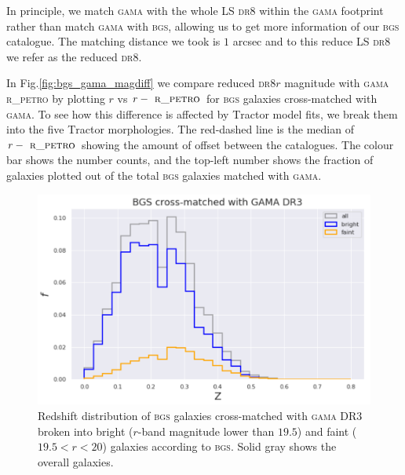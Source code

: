 \documentclass[fleqn,usenatbib]{mnras}
\newcommand{\BGS}{\textsc{bgs}\xspace}
\newcommand{\DReight}{\textsc{dr8}\xspace}
\newcommand{\GAMA}{\textsc{gama}\xspace}
\newcommand{\RPETRO}{{\textsc{ r\_petro}}\xspace}
\newcommand{\TRACTOR}{\textsc{T}ractor\xspace}
\begin{document}
In principle, we match \GAMA with the whole LS \DReight within the \GAMA footprint rather than match \GAMA with \BGS, allowing us to get more information of our \BGS catalogue. The matching distance we took is $1$ arcsec and to this reduce LS \DReight we refer as the reduced \DReight.

In Fig.\ref{fig:bgs_gama_magdiff} we compare reduced \DReight $r$ magnitude with \GAMA \RPETRO by plotting $r$ vs $r-\RPETRO$ for \BGS galaxies cross-matched with \GAMA. To see how this difference is affected by \TRACTOR model fits, we break them into the five \TRACTOR morphologies. The red-dashed line is the median of $r-\RPETRO$ showing the amount of offset between the catalogues. The colour bar shows the number counts, and the top-left number shows the fraction of galaxies plotted out of the total \BGS galaxies matched with \GAMA. 

\begin{figure}
	\includegraphics[width=\columnwidth]{images/bgs_gama_z}
    \caption{Redshift distribution of \BGS galaxies cross-matched with \GAMA DR3 broken into bright ($r$-band magnitude lower than $19.5$) and faint ($19.5 < r < 20$) galaxies according to \BGS.  Solid gray shows the overall galaxies.}
    \label{fig:bgs_gama_z}
\end{figure}
\end{document}
